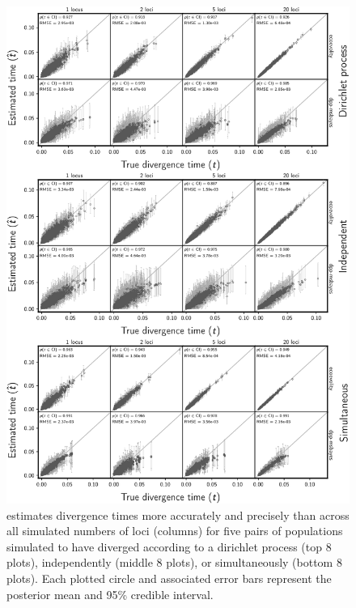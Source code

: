 \clearpage

\begin{figure}[htbp]
    \begin{center}
        \includegraphics[width=\textwidth,height=0.9\textheight,keepaspectratio]{../images/from-project-repo/plots/tex-plot-grids/grid-div-time-scatter-cropped.pdf}
        \caption{
            \scriptsize
            \Ecoevolity estimates divergence times more accurately
            and precisely than \dppmsbayes across all simulated
            numbers of loci (columns) for five pairs of populations simulated
            to have diverged according to a dirichlet process (top 8 plots),
            independently (middle 8 plots),
            or simultaneously (bottom 8 plots).
            Each plotted circle and associated error bars represent the posterior mean
            and 95\% credible interval.
            \accuracyscatterplotannotations{\comparisonetime{}}
        }
        \label{fig:divtimescatterindependent}
    \end{center}
\end{figure}

